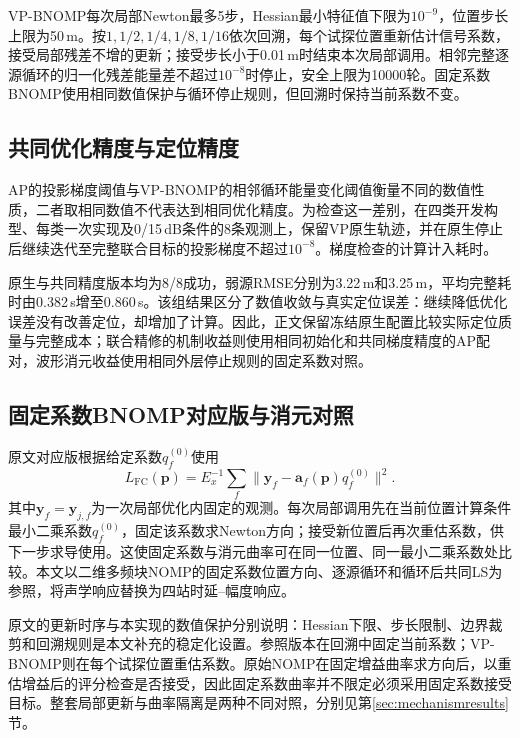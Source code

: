 \documentclass[a4paper]{cas-sc}
\numberwithin{equation}{section}
\numberwithin{figure}{section}
\numberwithin{table}{section}
\begin{document}
VP-BNOMP每次局部Newton最多5步，Hessian最小特征值下限为$10^{-9}$，位置步长上限为50\,m。按$1,1/2,1/4,1/8,1/16$依次回溯，每个试探位置重新估计信号系数，接受局部残差不增的更新；接受步长小于0.01\,m时结束本次局部调用。相邻完整逐源循环的归一化残差能量差不超过$10^{-8}$时停止，安全上限为10000轮。固定系数BNOMP使用相同数值保护与循环停止规则，但回溯时保持当前系数不变。

\subsection{共同优化精度与定位精度}\label{app:stoppingprecision}
AP的投影梯度阈值与VP-BNOMP的相邻循环能量变化阈值衡量不同的数值性质，二者取相同数值不代表达到相同优化精度。为检查这一差别，在四类开发构型、每类一次实现及0/15\,dB条件的8条观测上，保留VP原生轨迹，并在原生停止后继续迭代至完整联合目标的投影梯度不超过$10^{-8}$。梯度检查的计算计入耗时。

原生与共同精度版本均为8/8成功，弱源RMSE分别为3.22\,m和3.25\,m，平均完整耗时由0.382\,s增至0.860\,s。该组结果区分了数值收敛与真实定位误差：继续降低优化误差没有改善定位，却增加了计算。因此，正文保留冻结原生配置比较实际定位质量与完整成本；联合精修的机制收益则使用相同初始化和共同梯度精度的AP配对，波形消元收益使用相同外层停止规则的固定系数对照。

\subsection{固定系数BNOMP对应版与消元对照}
原文对应版根据给定系数$q_f^{(0)}$使用
\begin{equation}
 L_{\mathrm{FC}}(\bm p)=E_x^{-1}\sum_f
 \|\bm y_f-\bm a_f(\bm p)q_f^{(0)}\|^2 .\label{eq:fixedcoef}
\end{equation}
其中$\bm y_f=\bm y_{j,f}$为一次局部优化内固定的观测。每次局部调用先在当前位置计算条件最小二乘系数$q_f^{(0)}$，固定该系数求Newton方向；接受新位置后再次重估系数，供下一步求导使用。这使固定系数与消元曲率可在同一位置、同一最小二乘系数处比较。本文以二维多频块NOMP\cite{Yang2022}的固定系数位置方向、逐源循环和循环后共同LS为参照，将声学响应替换为四站时延--幅度响应。

原文的更新时序与本实现的数值保护分别说明：Hessian下限、步长限制、边界裁剪和回溯规则是本文补充的稳定化设置。参照版本在回溯中固定当前系数；VP-BNOMP则在每个试探位置重估系数。原始NOMP在固定增益曲率求方向后，以重估增益后的评分检查是否接受\cite{Mamandipoor2016}，因此固定系数曲率并不限定必须采用固定系数接受目标。整套局部更新与曲率隔离是两种不同对照，分别见第\ref{sec:mechanismresults}节。
\end{document}
